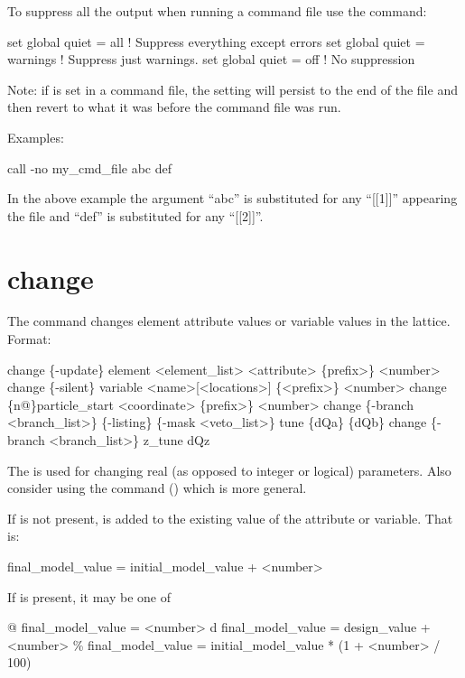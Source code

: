 To suppress all the output when running a command file use the command:
\begin{example}
  set global quiet = all       ! Suppress everything except errors
  set global quiet = warnings  ! Suppress just warnings.
  set global quiet = off       ! No suppression
\end{example}
Note: if  is set in a command file, the setting will persist to the end of the file and then
revert to what it was before the command file was run.

Examples:
\begin{example}
    call -no my_cmd_file abc def 
\end{example}
In the above example the argument ``abc'' is substituted for any ``[[1]]'' appearing the
file and ``def'' is substituted for any ``[[2]]''.  \Newline

\section{change}
\label{s:change}

The  command changes element attribute values or variable values in the 
lattice. Format:
\begin{example}
  change \{-update\} element <element_list> <attribute> \{prefix>\} <number>
  change \{-silent\} variable <name>[<locations>] \{<prefix>\} <number>
  change \{n@\}particle_start <coordinate> \{prefix>\} <number>
  change \{-branch <branch_list>\} \{-listing\} \{-mask <veto_list>\} tune \{dQa\} \{dQb\}
  change \{-branch <branch_list>\} z_tune dQz
\end{example}

\vskip 10pt 
The  is used for changing real (as opposed to integer or logical) parameters. Also
consider using the  command () which is more general.

If  is not present,  is added to the existing value
of the attribute or variable. That is:
\begin{example}
  final_model_value = initial_model_value + <number>
\end{example}
If  is present, it may be one of
\begin{example}
  @       final_model_value = <number>
  d       final_model_value = design_value + <number>
  \%       final_model_value = initial_model_value * (1 + <number> / 100)
\end{example}

